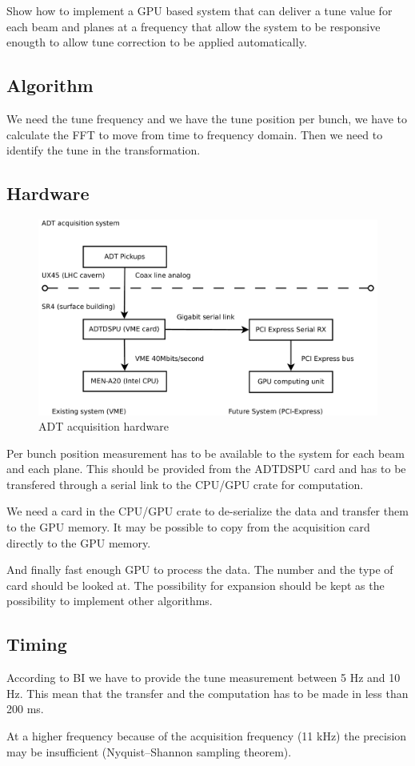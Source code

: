 Show how to implement a GPU based system that can deliver a tune value for each beam and planes at a frequency that allow the system to be responsive enougth to allow tune correction to be applied automatically. 

   \subsection{Algorithm}

   We need the tune frequency and we have the tune position per bunch, we have to calculate the FFT to move from time to frequency domain. Then we need to identify the tune in the transformation.

   \subsection{Hardware}

   \begin{figure}[H]
	\caption{ADT acquisition hardware}
	\centering
	\includegraphics[scale=0.3]{acquisition.pdf}
	\end{figure}

   Per bunch position measurement has to be available to the system for each beam and each plane. This should be provided from the ADTDSPU card and has to be transfered through a serial link to the CPU/GPU crate for computation.

   We need a card in the CPU/GPU crate to de-serialize the data and transfer them to the GPU memory. It may be possible to copy from the acquisition card directly to the GPU memory.

   And finally fast enough GPU to process the data. The number and the type of card should be looked at. The possibility for expansion should be kept as the possibility to implement other algorithms.
   
   \subsection{Timing}

   According to \gls{BI} we have to provide the tune measurement between 5 Hz and 10 Hz. This mean that the transfer and the computation has to be made in less than 200 ms.

   At a higher frequency because of the acquisition frequency (11 kHz) the precision may be insufficient (Nyquist–Shannon sampling theorem).